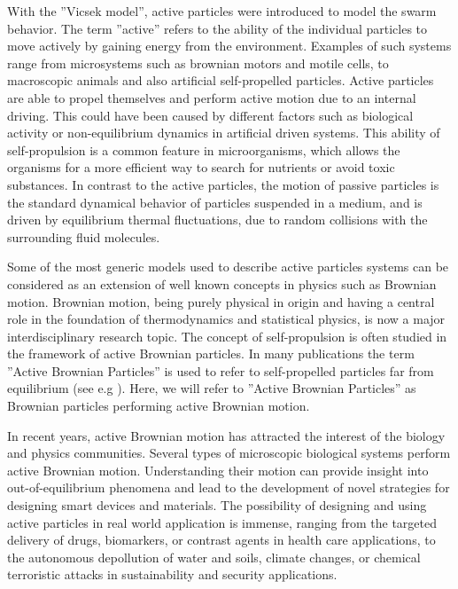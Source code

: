 With the ''Vicsek model'', active particles were introduced to model the 
swarm behavior. The term ''active'' refers to the ability of the individual 
particles to move actively by gaining energy from the 
environment\cite{romanczuk2012active}. Examples of such systems range from 
microsystems such as brownian motors\cite{reimann2002brownian} and 
motile cells\cite{friedrich2007chemotaxis,selmeczi2008cell,boedeker2010quantitative}, 
to macroscopic animals\cite{kareiva1983analyzing,komin2004random} and also 
artificial self-propelled particles\cite{paxton2004catalytic,howse2007self}. 
Active particles are able to propel themselves and perform active motion due 
to an internal driving. This could have been caused by different factors such 
as biological activity or non-equilibrium dynamics in artificial driven 
systems\cite{romanczuk2012active}. This ability of self-propulsion is a 
common feature in microorganisms\cite{lauga2009hydrodynamics, cates2012diffusive, poon2013clarkia}, 
which allows the organisms for a more efficient way to search for nutrients or 
avoid toxic substances\cite{viswanathan2011physics}. In contrast to the active particles, 
the motion of passive particles is the standard dynamical behavior of particles 
suspended in a medium, and is driven by equilibrium thermal fluctuations, due to 
random collisions with the surrounding fluid molecules\cite{babivc2005colloids}. 

Some of the most generic models used to describe active particles systems can be considered 
as an extension of well known concepts in physics such as Brownian motion. Brownian motion, 
being purely physical in origin and having a central role in the foundation of thermodynamics and 
statistical physics, is now a major interdisciplinary research topic. The concept of self-propulsion 
is often studied in the framework of active Brownian particles. In many publications 
the term ''Active Brownian Particles'' is used to refer to self-propelled particles 
far from equilibrium (see e.g \cite{schweitzer1998complex,ebeling1999active,erdmann2003collective,
schweitzer2003brownian,romanczuk2008beyond}). Here, we will refer to ''Active Brownian Particles'' 
as Brownian particles performing active Brownian motion.

In recent years, active Brownian motion has attracted the interest of the biology 
and physics communities\cite{ebbens2010pursuit, poon2013clarkia}. Several types of 
microscopic biological systems perform active Brownian motion. 
Understanding their motion can provide insight into out-of-equilibrium phenomena\cite{volpe2014simulation} 
and lead to the development of novel strategies for designing smart devices and materials\cite{bechinger2016active}. 
The possibility of designing and using active particles in real world application is immense, 
ranging from the targeted delivery of drugs, biomarkers, or contrast agents in 
health care applications\cite{nelson2010microrobots, wang2012nano, patra2013intelligent, abdelmohsen2014micro},
to the autonomous depollution of water and soils, 
climate changes, or chemical terroristic attacks in sustainability and security applications\cite{gao2014environmental}. 


